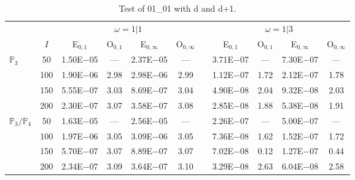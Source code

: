 \begin{table}[H]
\setlength{\tabcolsep}{5pt}
\centering
\caption{Test of 01\_01 with d and d+1.}
  \begin{tabular}{@{}l c c c c c c c c c c@{}}
\toprule
& & \multicolumn{4}{c}{$\omega=1|1$} &  & \multicolumn{4}{c}{$\omega=1|3$}\\
\cline{3-6} \cline{8-11} 
& $I$ & E$_{0,1}$ & O$_{0,1}$ & E$_{0,\infty}$ & O$_{0,\infty}$ &  & E$_{0,1}$ & O$_{0,1}$ & E$_{0,\infty}$ & O$_{0,\infty}$\\
\midrule
\multirow{4}{*}{$\mathbb{P}_{3}$}
 & 50 & 1.50E$-$05 & ---  & 2.37E$-$05 & --- &  & 3.71E$-$07 & --- & 7.30E$-$07 & ---\\
 & 100 & 1.90E$-$06 & 2.98  & 2.98E$-$06 & 2.99 &  & 1.12E$-$07 & 1.72 & 2.12E$-$07 & 1.78\\
 & 150 & 5.55E$-$07 & 3.03  & 8.69E$-$07 & 3.04 &  & 4.90E$-$08 & 2.04 & 9.32E$-$08 & 2.03\\
 & 200 & 2.30E$-$07 & 3.07  & 3.58E$-$07 & 3.08 &  & 2.85E$-$08 & 1.88 & 5.38E$-$08 & 1.91\\
\midrule
\multirow{4}{*}{$\mathbb{P}_{3}/\mathbb{P}_{4}$}
 & 50 & 1.63E$-$05 & ---  & 2.56E$-$05 & --- &  & 2.26E$-$07 & --- & 5.00E$-$07 & ---\\
 & 100 & 1.97E$-$06 & 3.05  & 3.09E$-$06 & 3.05 &  & 7.36E$-$08 & 1.62 & 1.52E$-$07 & 1.72\\
 & 150 & 5.70E$-$07 & 3.07  & 8.89E$-$07 & 3.07 &  & 7.02E$-$08 & 0.12 & 1.27E$-$07 & 0.44\\
 & 200 & 2.34E$-$07 & 3.09  & 3.64E$-$07 & 3.10 &  & 3.29E$-$08 & 2.63 & 6.04E$-$08 & 2.58\\
\bottomrule
\end{tabular}
\label{none}
\end{table}
